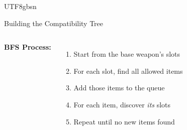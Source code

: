 \documentclass[aspectratio=169]{beamer}
\begin{document}
\begin{CJK*}{UTF8}{gbsn}



\begin{frame}{Building the Compatibility Tree}
    \begin{columns}
        \textbf{BFS Process:}
        \begin{enumerate}
            \item Start from the base weapon's slots
            \item For each slot, find all allowed items
            \item Add those items to the queue
            \item For each item, discover \textit{its} slots
            \item Repeat until no new items found
        \end{enumerate}


\end{columns}
\end{frame}
\end{CJK*}
\end{document}
